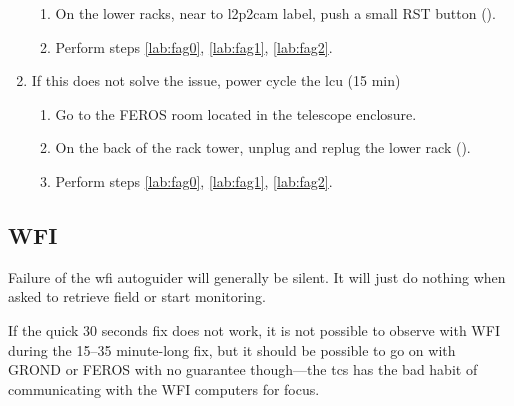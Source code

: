 \documentclass[11pt,fleqn,a4paper]{book}
\begin{document}
\begin{enumerate}
\begin{enumerate}
       \item On the lower racks, near to l2p2cam label, push a small RST button ().
       \item Perform steps \ref{lab:fag0}, \ref{lab:fag1}, \ref{lab:fag2}.
    \end{enumerate}
    \item If this does not solve the issue, \gls{power cycle} the \gls{lcu} (15 min)
    \begin{enumerate}
        \item Go to the FEROS room located in the telescope enclosure. 
        \item On the back of the rack tower, unplug and replug the lower rack ().
        \item Perform steps \ref{lab:fag0}, \ref{lab:fag1}, \ref{lab:fag2}.
    \end{enumerate}
\end{enumerate}

\subsection{WFI}
Failure of the \gls{wfi} autoguider will generally be silent.  It will just do nothing when asked to retrieve field or start monitoring.

If the quick 30 seconds fix does not work, it is not possible to observe with WFI during the 15--35 minute-long fix, but it should be possible to go on with GROND or FEROS with no guarantee though---the \gls{tcs} has the bad habit of communicating with the WFI computers for \gls{focus}. 
\end{document}
